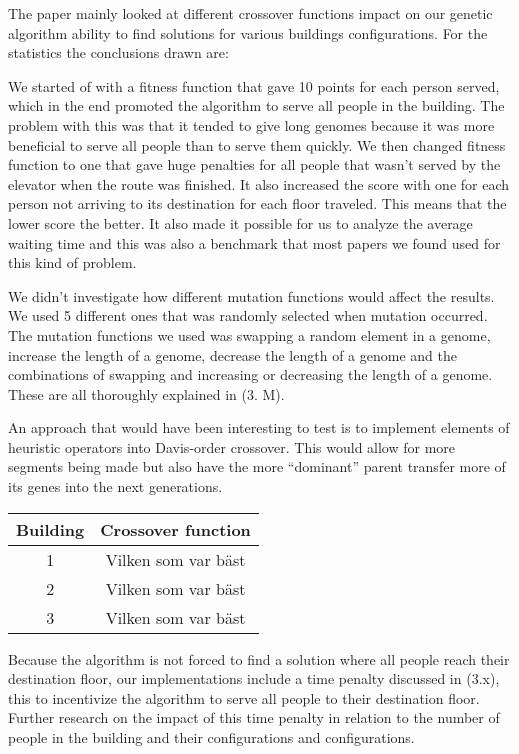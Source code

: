 
The paper mainly looked at different crossover functions impact on our genetic algorithm ability to find solutions for various buildings configurations. For the statistics the conclusions drawn are:

We started of with a fitness function that gave 10 points for each person served, which in the end promoted the algorithm to serve all people in the building. The problem with this was that it tended to give long genomes because it was more beneficial to serve all people than to serve them quickly. We then changed fitness function to one that gave huge penalties for all people that wasn't served by the elevator when the route was finished. It also increased the score with one for each person not arriving to its destination for each floor traveled. This means that the lower score the better. It also made it possible for us to analyze the average waiting time and this was also a benchmark that most papers we found used for this kind of problem.

We didn't investigate how different mutation functions would affect the results. We used 5 different ones that was randomly selected when mutation occurred. The mutation functions we used was swapping a random element in a genome, increase the length of a genome, decrease the length of a genome and the combinations of swapping and increasing or decreasing the length of a genome. These are all thoroughly explained in (3. M).

An approach that would have been interesting to test is to implement elements of heuristic operators into Davis-order crossover. This would allow for more segments being made but also have the more “dominant” parent transfer more of its genes into the next generations.

\begin{center}
	\begin{tabular}{|c|c|}
		\hline
		Building & Crossover function  \\ \hline
		1        & Vilken som var bäst \\ \hline
		2        & Vilken som var bäst \\ \hline
		3        & Vilken som var bäst \\ \hline
	\end{tabular}
\end{center}
Because the algorithm is not forced to find a solution where all people reach their destination floor, our implementations include a time penalty discussed in (3.x), this to incentivize the algorithm to serve all people to their destination floor. Further research on the impact of this time penalty in relation to the number of people in the building and their configurations and configurations.


